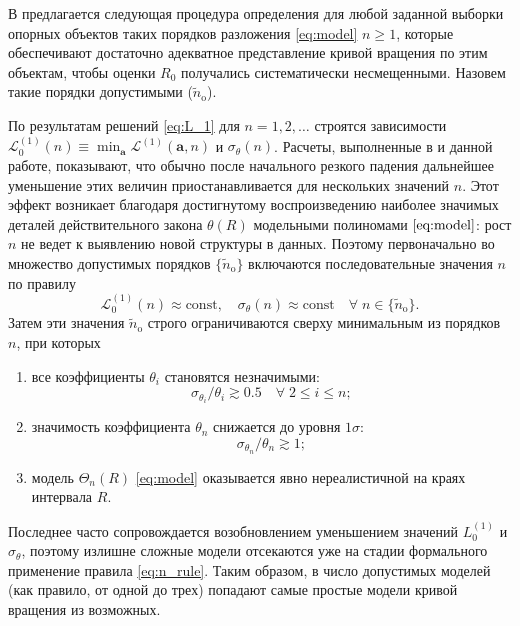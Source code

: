 \documentclass[a4paper, oneside, 14pt]{article}
\newcommand{\npar}{\par\vspace{\baselineskip}}
\begin{document}
В \cite{N.2003} предлагается следующая процедура определения для любой заданной выборки опорных объектов таких порядков разложения \eqref{eq:model} $ n \ge 1 $, которые обеспечивают достаточно адекватное представление кривой вращения по этим объектам, чтобы оценки $ R_0 $ получались систематически несмещенными. Назовем такие порядки допустимыми ($ \tilde{n}_\text{o} $).

По результатам решений \eqref{eq:L_1} для $ n = 1, 2, \ldots $ строятся зависимости $ \mathcal{L}_0^{(1)}(n) \equiv \min_\mathbf{a} \mathcal{L}^{(1)}(\mathbf{a}, n) $ и $ \sigma_\theta(n) $. Расчеты, выполненные в \cite{N.2003} и данной работе, показывают, что обычно после начального резкого падения дальнейшее уменьшение этих величин приостанавливается для нескольких значений $ n $. Этот эффект возникает благодаря достигнутому воспроизведению наиболее значимых деталей действительного закона $ \theta(R) $ модельными полиномами $ \eqref{eq:model} $: рост $ n $ не ведет к выявлению новой структуры в данных. Поэтому первоначально во множество допустимых порядков $ \{ \tilde{n}_\text{o} \} $ включаются последовательные значения $ n $ по правилу
%
\begin{equation}
  \label{eq:n_rule}
  \mathcal{L}_0^{(1)}(n) \approx \text{const}, \quad \sigma_\theta(n) \approx \text{const} \quad \forall \; n \in \{ \tilde{n}_\text{o} \}.
\end{equation}
%
Затем эти значения $ \tilde{n}_\text{o} $ строго ограничиваются сверху минимальным из порядков $ n $, при которых\npar

\begin{enumerate}[label={\arabic*)}]
  \item все коэффициенты $ \theta_i $ становятся незначимыми:
  \begin{equation}
    \sigma_{\theta_i} / \theta_i \gtrsim 0.5 \quad \forall \; 2 \le i \le n;
  \end{equation}

  \item значимость коэффициента $ \theta_n $ снижается до уровня $ 1 \sigma $:
  \begin{equation}
    \sigma_{\theta_n} / \theta_n \gtrsim 1;
  \end{equation}

  \item модель $ \Theta_n(R) $ \eqref{eq:model} оказывается явно нереалистичной на краях интервала $ R $.
\end{enumerate}

Последнее часто сопровождается возобновлением уменьшением значений $ L_0^{(1)} $ и $ \sigma_\theta $, поэтому излишне сложные модели отсекаются уже на стадии формального применение правила \eqref{eq:n_rule}. Таким образом, в число допустимых моделей (как правило, от одной до трех) попадают самые простые модели кривой вращения из возможных.
\end{document}
